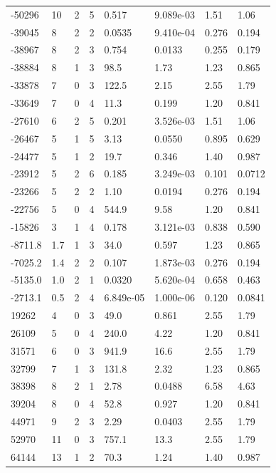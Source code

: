 \documentclass[preview]{standalone}
\begin{document}
{{\begin{tabular}{L{1.2cm}C{1.2cm} C{0.3cm}C{0.5cm} C{1.4cm}C{1.4cm} C{1.4cm}C{1.4cm}}
  -50296  &    10  & 2     &  5 &  0.517  & 9.089e-03  & 1.51 &  1.06   \\ 
  -39045  &     8  & 2     &  2 &  0.0535  & 9.410e-04  & 0.276 &  0.194   \\ 
  -38967  &     8  & 2     &  3 &  0.754  & 0.0133  & 0.255 &  0.179   \\ 
  -38884  &     8  & 1     &  3 &  98.5  & 1.73  & 1.23 &  0.865   \\ 
  -33878  &     7  & 0     &  3 &  122.5  & 2.15  & 2.55 &  1.79   \\ 
  -33649  &     7  & 0     &  4 &  11.3  & 0.199  & 1.20 &  0.841   \\ 
  -27610  &     6  & 2     &  5 &  0.201  & 3.526e-03  & 1.51 &  1.06   \\ 
  -26467  &     5  & 1     &  5 &  3.13  & 0.0550  & 0.895 &  0.629   \\ 
  -24477  &     5  & 1     &  2 &  19.7  & 0.346  & 1.40 &  0.987   \\ 
  -23912  &     5  & 2     &  6 &  0.185  & 3.249e-03  & 0.101 &  0.0712   \\ 
  -23266  &     5  & 2     &  2 &  1.10  & 0.0194  & 0.276 &  0.194   \\ 
  -22756  &     5  & 0     &  4 &  544.9  & 9.58  & 1.20 &  0.841   \\ 
  -15826  &     3  & 1     &  4 &  0.178  & 3.121e-03  & 0.838 &  0.590   \\ 
  -8711.8  &   1.7  & 1     &  3 &  34.0  & 0.597  & 1.23 &  0.865   \\ 
  -7025.2  &   1.4  & 2     &  2 &  0.107  & 1.873e-03  & 0.276 &  0.194   \\ 
  -5135.0  &   1.0  & 2     &  1 &  0.0320  & 5.620e-04  & 0.658 &  0.463   \\ 
  -2713.1  &   0.5  & 2     &  4 &  6.849e-05  & 1.000e-06  & 0.120 &  0.0841   \\ 
  19262  &     4  & 0     &  3 &  49.0  & 0.861  & 2.55 &  1.79   \\ 
  26109  &     5  & 0     &  4 &  240.0  & 4.22  & 1.20 &  0.841   \\ 
  31571  &     6  & 0     &  3 &  941.9  & 16.6  & 2.55 &  1.79   \\ 
  32799  &     7  & 1     &  3 &  131.8  & 2.32  & 1.23 &  0.865   \\ 
  38398  &     8  & 2     &  1 &  2.78  & 0.0488  & 6.58 &  4.63   \\ 
  39204  &     8  & 0     &  4 &  52.8  & 0.927  & 1.20 &  0.841   \\ 
  44971  &     9  & 2     &  3 &  2.29  & 0.0403  & 2.55 &  1.79   \\ 
  52970  &    11  & 0     &  3 &  757.1  & 13.3  & 2.55 &  1.79   \\ 
  64144  &    13  & 1     &  2 &  70.3  & 1.24  & 1.40 &  0.987   \\ 
\hline 
\end{tabular} 

}}
\end{document}
